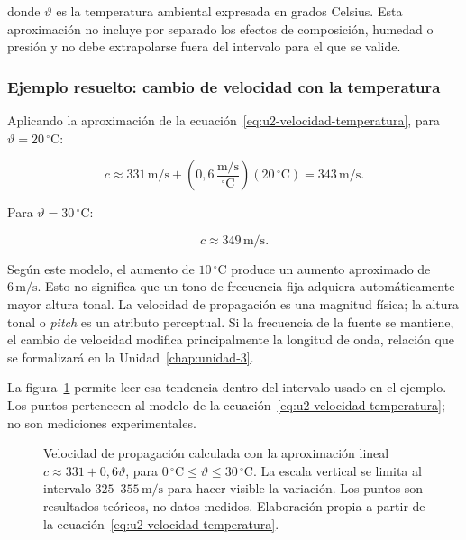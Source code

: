 donde \(\vartheta\) es la temperatura ambiental expresada en grados Celsius.
Esta aproximación no incluye por separado los efectos de composición, humedad
o presión y no debe extrapolarse fuera del intervalo para el que se valide.

\subsubsection*{Ejemplo resuelto: cambio de velocidad con la temperatura}

Aplicando la aproximación de la ecuación~\eqref{eq:u2-velocidad-temperatura},
para \(\vartheta=20\,^{\circ}\text{C}\):

\[
    c\approx331\,\text{m}/\text{s}
    +\left(0{,}6\,\frac{\text{m}/\text{s}}{^{\circ}\text{C}}\right)
    (20\,^{\circ}\text{C})
    =343\,\text{m}/\text{s}.
\]

Para \(\vartheta=30\,^{\circ}\text{C}\):

\[
    c\approx349\,\text{m}/\text{s}.
\]

Según este modelo, el aumento de \(10\,^{\circ}\text{C}\) produce un aumento aproximado de \(6\,\text{m}/\text{s}\). Esto no significa que un tono de frecuencia fija adquiera automáticamente mayor altura tonal. La velocidad de propagación es una magnitud física; la altura tonal o \emph{pitch} es un atributo perceptual. Si la frecuencia de la fuente se mantiene, el cambio de velocidad modifica principalmente la longitud de onda, relación que se formalizará en la Unidad~\ref{chap:unidad-3}.

La figura~\ref{fig:u2-velocidad-temperatura} permite leer esa tendencia dentro
del intervalo usado en el ejemplo. Los puntos pertenecen al modelo de la
ecuación~\eqref{eq:u2-velocidad-temperatura}; no son mediciones experimentales.

\begin{figure}[ht]
    \centering
    
    \caption{Velocidad de propagación calculada con la aproximación lineal
    \(c\approx331+0{,}6\vartheta\), para
    \(0\,^{\circ}\text{C}\leq\vartheta\leq
    30\,^{\circ}\text{C}\). La escala vertical se limita al intervalo
    \(325\)--\(355\,\text{m}/\text{s}\) para hacer visible la variación. Los
    puntos son resultados teóricos, no datos medidos. Elaboración propia a
    partir de la ecuación~\eqref{eq:u2-velocidad-temperatura}.}
    \label{fig:u2-velocidad-temperatura}
\end{figure}

